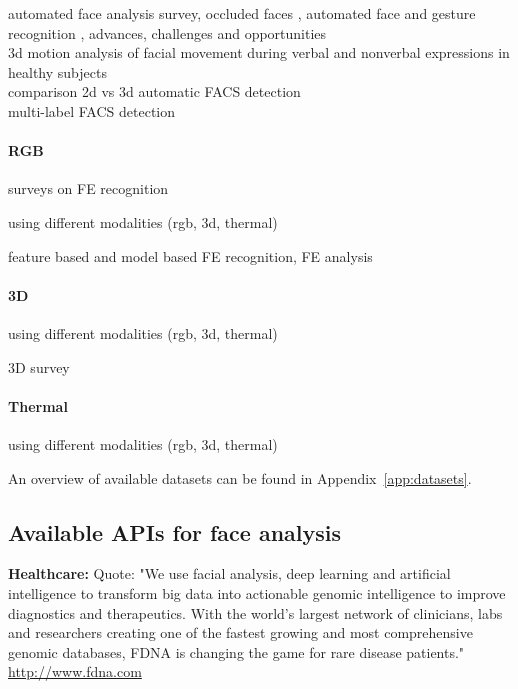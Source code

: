 automated face analysis \cite{Cohn2014}survey\cite{Fasel2003}, occluded faces \cite{Cotter2010}, automated face and gesture recognition \cite{de2015intraface}, advances, challenges and opportunities \cite{Martinez2016}\\


3d motion analysis of facial movement during verbal and nonverbal expressions in healthy subjects \cite{Sidequersky2016}\\

comparison 2d vs 3d automatic FACS detection \cite{Savran2012}\\

multi-label FACS detection \cite{Chu2016}\\



\paragraph{RGB}
surveys on FE recognition\cite{Anil2016}\cite{Pantic2000}\cite{Sariyanidi2015}

using different modalities (rgb, 3d, thermal)\cite{Corneanu2016survey}

feature based and model based FE recognition\cite{Mishra2015}, FE analysis \cite{Tian2005}

\paragraph{3D}
using different modalities (rgb, 3d, thermal)\cite{Corneanu2016survey}

3D \cite{Danelakis2015}survey\cite{Sandbach2012survey}
\paragraph{Thermal}
using different modalities (rgb, 3d, thermal)\cite{Corneanu2016survey}






An overview of available datasets can be found in Appendix~\ref{app:datasets}.


\subsection{Available APIs for face analysis}

\textbf{Healthcare:} 
Quote: "We use facial analysis, deep learning and artificial intelligence to transform big data into actionable genomic intelligence to improve diagnostics and therapeutics. With the world’s largest network of clinicians, labs and researchers creating one of the fastest growing and most comprehensive genomic databases, FDNA is changing the game for rare disease patients."
\url{http://www.fdna.com}\\



